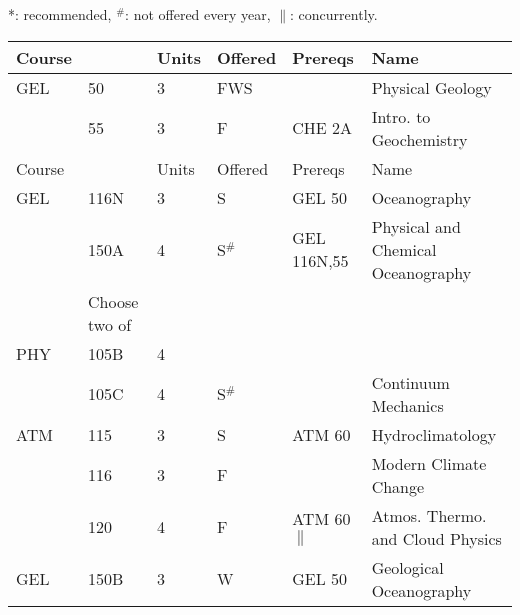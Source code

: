 \documentclass[12pt]{article}
\begin{document}
\vskip 0.25cm
\noindent
*: recommended, $^\#$: not offered every year, $\parallel$: concurrently.\\
\begin{tabular}{|llllll|}
\hline
Course & & Units & Offered & Prereqs & Name \\
\hline
GEL  & 50     & 3 & FWS & & Physical Geology \\
     & 55     & 3 & F      & CHE 2A & Intro. to Geochemistry\\
\hline
\hline
Course & & Units & Offered & Prereqs & Name \\
\hline
GEL  & 116N   & 3 & S      & GEL 50          & Oceanography\\
     & 150A   & 4 & S$^\#$ & GEL 116N,55 & Physical and Chemical Oceanography\\
\hline
\hline
    & Choose two of & & & & \\
\hline
PHY  & 105B  & 4 & & & \\
     & 105C  & 4 & S$^\#$ & & Continuum Mechanics \\
ATM  & 115   & 3 & S   & ATM 60 & Hydroclimatology \\
     & 116   & 3 & F   & & Modern Climate Change \\
     & 120   & 4 & F   & ATM 60$\parallel$ & Atmos. Thermo. and Cloud Physics \\
GEL  & 150B  & 3 & W & GEL 50 & Geological Oceanography\\
\hline
\end{tabular}\\

\newpage
\end{document}

